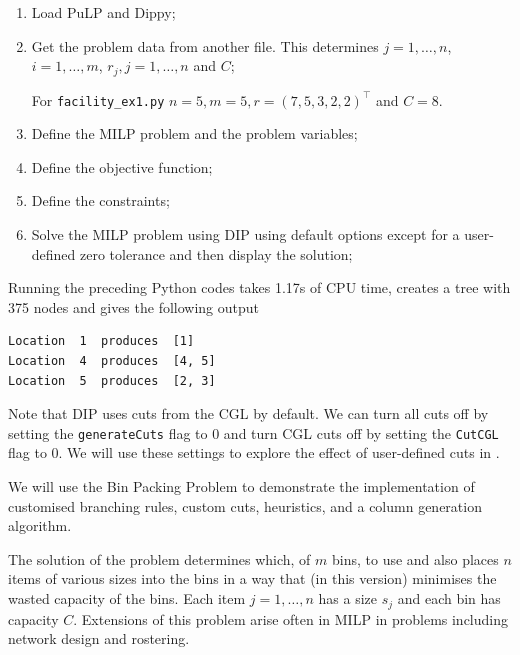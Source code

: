 \begin{enumerate}
\item Load PuLP and Dippy;


\item Get the problem data from another file. This determines $j=1, \ldots, n$, $i = 1, \ldots, m$, $r_j, j = 1, \ldots, n$ and $C$;

For {\tt facility\_ex1.py} $n = 5, m = 5, r = (7, 5, 3, 2, 2)^\top$ and $C = 8$.

\item Define the \ac{MILP} problem and the problem variables;


\item Define the objective function;


\item Define the constraints; 

\item Solve the \ac{MILP} problem using \ac{DIP} using default options except for a user-defined zero tolerance and then display the solution;

\end{enumerate}
Running the preceding Python codes takes 1.17s of CPU time, creates a tree with 375 nodes and gives the following output
\begin{verbatim}
Location  1  produces  [1]
Location  4  produces  [4, 5]
Location  5  produces  [2, 3]
\end{verbatim}

Note that \ac{DIP} uses cuts from the \ac{CGL} \cite{coin_or} by default. We can turn all cuts off by setting the {\tt generateCuts} flag to 0 and turn \ac{CGL} cuts off by setting the {\tt CutCGL} flag to 0. We will use these settings to explore the effect of user-defined cuts in .

We will use the Bin Packing Problem to demonstrate the implementation of customised branching rules, custom cuts, heuristics, and a column generation algorithm.

The solution of the problem determines which, of $m$ bins, to use and also places $n$ items of various sizes into the bins in a way that (in this version) minimises the wasted capacity of the bins.
Each item $j=1, \ldots, n$ has a size $s_j$ and each bin has capacity $C$.
Extensions of this problem arise often in \ac{MILP} in problems including network design and rostering.

